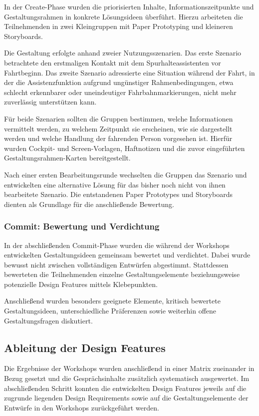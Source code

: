 In der Create-Phase wurden die priorisierten Inhalte, Informationszeitpunkte
und Gestaltungsrahmen in konkrete Lösungsideen überführt. Hierzu arbeiteten die
Teilnehmenden in zwei Kleingruppen mit Paper Prototyping und kleineren Storyboards.

Die Gestaltung erfolgte anhand zweier Nutzungsszenarien. Das erste Szenario
betrachtete den erstmaligen Kontakt mit dem Spurhalteassistenten vor
Fahrtbeginn. Das zweite Szenario adressierte eine Situation während der Fahrt,
in der die Assistenzfunktion aufgrund ungünstiger Rahmenbedingungen, etwa
schlecht erkennbarer oder uneindeutiger Fahrbahnmarkierungen, nicht mehr
zuverlässig unterstützen kann.

Für beide Szenarien sollten die Gruppen bestimmen, welche Informationen
vermittelt werden, zu welchem Zeitpunkt sie erscheinen, wie sie dargestellt
werden und welche Handlung der fahrenden Person vorgesehen ist. Hierfür wurden
Cockpit- und Screen-Vorlagen, Haftnotizen und die zuvor eingeführten
Gestaltungsrahmen-Karten bereitgestellt.

Nach einer ersten Bearbeitungsrunde wechselten die Gruppen das Szenario und
entwickelten eine alternative Lösung für das bisher noch nicht von ihnen bearbeitete Szenario. Die entstandenen Paper Prototypes und Storyboards dienten als Grundlage für
die anschließende Bewertung.

\subsubsection{Commit: Bewertung und Verdichtung}
\label{subsubsec:Commit}

In der abschließenden Commit-Phase wurden die während der Workshops
entwickelten Gestaltungsideen gemeinsam bewertet und verdichtet. Dabei wurde
bewusst nicht zwischen vollständigen Entwürfen abgestimmt. Stattdessen
bewerteten die Teilnehmenden einzelne Gestaltungselemente beziehungsweise
potenzielle Design Features mittels Klebepunkten.

Anschließend wurden besonders geeignete Elemente, kritisch bewertete Gestaltungsideen, unterschiedliche Präferenzen sowie weiterhin offene Gestaltungsfragen diskutiert.

\subsection{Ableitung der Design Features}
\label{subsec:Ableitung_Design_Features}

Die Ergebnisse der Workshops wurden anschließend in einer Matrix zueinander in Bezug gesetzt und die Gesprächsinhalte zusätzlich systematisch ausgewertet. Im abschließenden Schritt konnten die entwickelten Design Features jeweils auf die zugrunde liegenden Design Requirements sowie auf die Gestaltungselemente der Entwürfe in den Workshops zurückgeführt werden.


